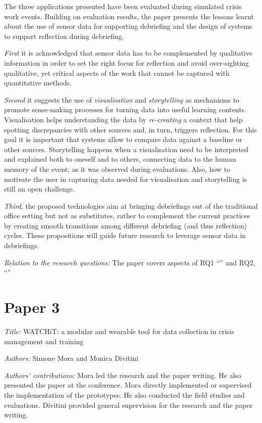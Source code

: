 The three applications presented have been evaluated during simulated crisis work events. Building on evaluation results, the paper presents the lessons learnt about the use of sensor data for supporting debriefing and the design of systems to support reflection during debriefing. 

\emph{First} it is acknowledged that sensor data has to be complemented by qualitative information in order to set the right focus for reflection and avoid over-sighting qualitative, yet critical aspects of the work that cannot be captured with quantitative methods.

\emph{Second} it suggests the use of \emph{visualisation} and \emph{storytelling} as mechanisms to promote sense-making processes for turning data into useful learning contents. Visualisation helps understanding the data by \emph{re-creating} a context that help spotting discrepancies with other sources and, in turn, triggers reflection. For this goal it is important that systems allow to compare data against a baseline or other sources. Storytelling happens when a visualisation need to be interpreted and explained both to oneself and to others, connecting data to the human memory of the event; as it was observed during evaluations. Also, how to motivate the user in capturing data needed for visualisation and storytelling is still an open challenge.

\emph{Third}, the proposed technologies aim at bringing debriefings out of the traditional office setting but not as substitutes, rather to complement the current practices by creating smooth transitions among different debriefing (and thus reflection) cycles. These propositions will guide future research to leverage sensor data in debriefings.

\emph{Relation to the research questions:} The paper covers aspects of RQ1 ``\RQi'' and RQ2, ``\RQi''

\section[P3: WATCHiT: a modular and wearable tool for data collection in crisis management and training]{Paper 3}\label{paper-3}

\emph{Title:} WATCHiT: a modular and wearable tool for data collection in crisis management and training

\emph{Authors:} Simone Mora and Monica Divitini

\emph{Authors' contributions:} Mora led the research and the paper writing. He also presented the paper at the conference. Mora directly implemented or supervised the implementation of the prototypes. He also conducted the field studies and evaluations. Divitini provided general supervision for the research and the paper writing.

